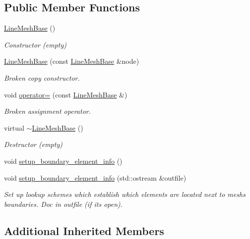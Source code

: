 \subsection*{Public Member Functions}
\begin{DoxyCompactItemize}
\item 
\hyperlink{classoomph_1_1LineMeshBase_a17ac7e4db35e550c05c12368132b48df}{Line\+Mesh\+Base} ()
\begin{DoxyCompactList}\small\item\em Constructor (empty) \end{DoxyCompactList}\item 
\hyperlink{classoomph_1_1LineMeshBase_ae1fc7877845a06c7f23bafdf2fd9954b}{Line\+Mesh\+Base} (const \hyperlink{classoomph_1_1LineMeshBase}{Line\+Mesh\+Base} \&node)
\begin{DoxyCompactList}\small\item\em Broken copy constructor. \end{DoxyCompactList}\item 
void \hyperlink{classoomph_1_1LineMeshBase_a31bcd5dc1a4c81e95ad21b15865561f1}{operator=} (const \hyperlink{classoomph_1_1LineMeshBase}{Line\+Mesh\+Base} \&)
\begin{DoxyCompactList}\small\item\em Broken assignment operator. \end{DoxyCompactList}\item 
virtual \hyperlink{classoomph_1_1LineMeshBase_a1716fa6bd365f1a4fa852ee99ab9b46b}{$\sim$\+Line\+Mesh\+Base} ()
\begin{DoxyCompactList}\small\item\em Destructor (empty) \end{DoxyCompactList}\item 
void \hyperlink{classoomph_1_1LineMeshBase_ac630cc88daeec61aff7335c2b1d77d91}{setup\+\_\+boundary\+\_\+element\+\_\+info} ()
\item 
void \hyperlink{classoomph_1_1LineMeshBase_a309fc1aa6fe508a32cd6c0e863d5b1c6}{setup\+\_\+boundary\+\_\+element\+\_\+info} (std\+::ostream \&outfile)
\begin{DoxyCompactList}\small\item\em Set up lookup schemes which establish which elements are located next to mesh\textquotesingle{}s boundaries. Doc in outfile (if it\textquotesingle{}s open). \end{DoxyCompactList}\end{DoxyCompactItemize}
\subsection*{Additional Inherited Members}


